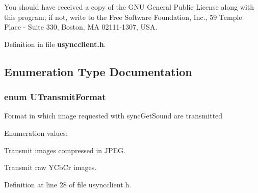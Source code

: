 You should have received a copy of the GNU General Public License along with this program; if not, write to the Free Software Foundation, Inc., 59 Temple Place - Suite 330, Boston, MA 02111-1307, USA.

Definition in file {\bf usyncclient.h}.

\subsection{Enumeration Type Documentation}
\subsubsection{\setlength{\rightskip}{0pt plus 5cm}enum {\bf UTransmit\-Format}}\label{usyncclient_8h_a2}


Format in which image requested with sync\-Get\-Sound are transmitted \begin{Desc}
\item[Enumeration values: ]\par
\begin{description}
\item[{\em 
URBI\_\-TRANSMIT\_\-JPEG\label{usyncclient_8h_a2a0}
}]Transmit images compressed in JPEG. \item[{\em 
URBI\_\-TRANSMIT\_\-YCb\-Cr\label{usyncclient_8h_a2a1}
}]Transmit raw YCb\-Cr images. \end{description}
\end{Desc}



Definition at line 28 of file usyncclient.h.
